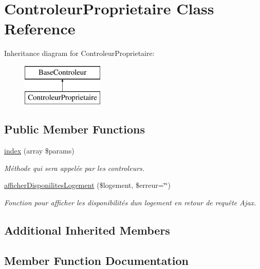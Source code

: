 \hypertarget{class_controleur_proprietaire}{}\section{Controleur\+Proprietaire Class Reference}
\label{class_controleur_proprietaire}
Inheritance diagram for Controleur\+Proprietaire\+:\begin{figure}[H]
\begin{center}
\leavevmode
\includegraphics[height=2.000000cm]{class_controleur_proprietaire}
\end{center}
\end{figure}
\subsection*{Public Member Functions}
\begin{DoxyCompactItemize}
\item 
\hyperlink{class_controleur_proprietaire_a7674640e347cb516323e37014fe55b4f}{index} (array \$params)
\begin{DoxyCompactList}\small\item\em Méthode qui sera appelée par les controleurs. \end{DoxyCompactList}\item 
\hyperlink{class_controleur_proprietaire_a61d3cf4f60f8c768c0cfeed25084d4dd}{afficher\+Disponilites\+Logement} (\$logement, \$erreur=\char`\"{}\char`\"{})
\begin{DoxyCompactList}\small\item\em Fonction pour afficher les disponibilités d\textquotesingle{}un logement en retour de requête Ajax. \end{DoxyCompactList}\end{DoxyCompactItemize}
\subsection*{Additional Inherited Members}


\subsection{Member Function Documentation}
\mbox{\label{class_controleur_proprietaire_a61d3cf4f60f8c768c0cfeed25084d4dd}} 
